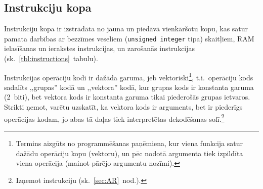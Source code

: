 \subsection{Instrukciju kopa} \label{sec:instrSet}

Instrukciju kopa ir izstrādāta no jauna un piedāvā vienkāršotu kopu, kas
satur pamata darbības ar bezzīmes veseliem (\texttt{unsigned integer} tipa)
skaitļiem, RAM ielasīšanas un ierakstes instrukcijas, un zarošanās
instrukcijas (sk.~\ref{tbl:instructions}~tabulu).

Instrukcijas operāciju kodi ir dažāda garuma, jeb vektoriski\footnote{%
	Termins aizgūts no programmēšanas paņēmiena, kur viena funkcija
	satur dažādu operāciju kopu (vektoru), un pēc nodotā argumenta tiek
	izpildīta viena operācija (mainot pārējo argumentu nozīmi).},
t.i.~operāciju kods sadalīts ,,grupas'' kodā un ,,vektora'' kodā, kur
grupas kods ir konstanta garuma (2~biti), bet vektora kods ir konstanta
garuma tikai piederošās grupas ietvaros. Strikti ņemot, varētu uzskatīt, ka
vektora kods ir arguments, bet ir piederīgs operācijas
kodam, jo abas tā daļas tiek interpretētas dekodēšanas solī.\footnote{%
	Izņemot  instrukciju (sk.~\ref{sec:AR}~nod.).}

